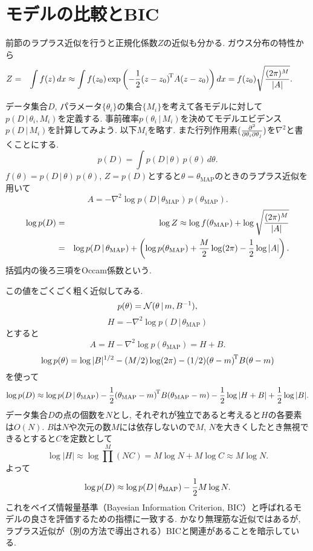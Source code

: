 \section{モデルの比較とBIC}\label{ch4_bic}
前節のラプラス近似を行うと正規化係数$Z$の近似も分かる. ガウス分布の特性から
\begin{eqnarray}\label{ch4_approx}
Z&=&\int f(z)\,dx
 \approx \int f(z_0) \exp\left(-\frac{1}{2}{(z-z_0)}^{\!\mathrm{T}}A(z-z_0)\right) dx
 = f(z_0)\sqrt{\frac{(2\pi)^M}{|A|}}.
 \qquad
\end{eqnarray}

データ集合$D$, パラメータ$\{\theta_i\}$の集合$\{M_i\}$を考えて各モデルに対して$p(D\,|\,\theta_i, M_i)$を定義する.
事前確率$p(\theta_i\,|\,M_i)$を決めてモデルエビデンス$p(D\,|\,M_i)$を計算してみよう. 以下$M_i$を略す.
また行列作用素$(\frac{\partial^2}{\partial \theta_i \partial \theta_j})$を$\nabla^2$と書くことにする.
$$
p(D)=\int p(D\,|\,\theta)\,p(\theta)\,d\theta.
$$
$f(\theta)=p(D\,|\,\theta)\,p(\theta)$, $Z=p(D)$とすると$\theta=\theta_{\text{MAP}}$のときのラプラス近似を用いて
$$
A=-\nabla^2 \log p(D\,|\,\theta_{\text{MAP}})\,p(\theta_{\text{MAP}}).
$$
\begin{eqnarray*}
\log p(D)&=&\log Z \approx \log f(\theta_{\text{MAP}}) + \log \sqrt{\frac{(2\pi)^M}{|A|}}\\
         &=&\log p(D\,|\,\theta_{\text{MAP}})+\left(\log p(\theta_{\text{MAP}})+\frac{M}{2} \log (2\pi) - \frac{1}{2} \log |A|\right).
\end{eqnarray*}
括弧内の後ろ三項をOccam係数という.

この値をごくごく粗く近似してみる.
$$
p(\theta)={\cal N}(\theta\,|\,m,B^{-1}),
$$
$$
H=-\nabla^2\log p(D\,|\,\theta_{\text{MAP}})
$$
とすると
$$
A=H-\nabla^2\log p(\theta_{\text{MAP}})=H+B.
$$
$$
\log p(\theta)=\log|B|^{1/2}-(M/2)\log(2\pi)-(1/2){(\theta-m)}^{\!\mathrm{T}}B{(\theta-m)}
$$
を使って
$$
\log p(D) \approx \log p(D\,|\,\theta_{\text{MAP}})-\frac{1}{2}{(\theta_{\text{MAP}}-m)}^{\!\mathrm{T}}B(\theta_{\text{MAP}}-m)-\frac{1}{2}\log |H+B|+\frac{1}{2}\log |B|.
$$
データ集合$D$の点の個数を$N$とし, それぞれが独立であると考えると$H$の各要素は$O(N)$. $B$は$N$や次元の数$M$には依存しないので$M$, $N$を大きくしたとき無視できるとすると$C$を定数として
$$
\log |H| \approx \log \prod^M (N C) = M \log N + M \log C \approx M \log N.
$$
よって
$$
\log p(D) \approx \log p(D\,|\,\theta_{\text{MAP}}) - \frac{1}{2} M \log N.
$$
これをベイズ情報量基準（Bayesian Information Criterion, BIC）と呼ばれるモデルの良さを評価するための指標に一致する.
かなり無理筋な近似ではあるが, ラプラス近似が（別の方法で導出される）BICと関連があることを暗示している.

